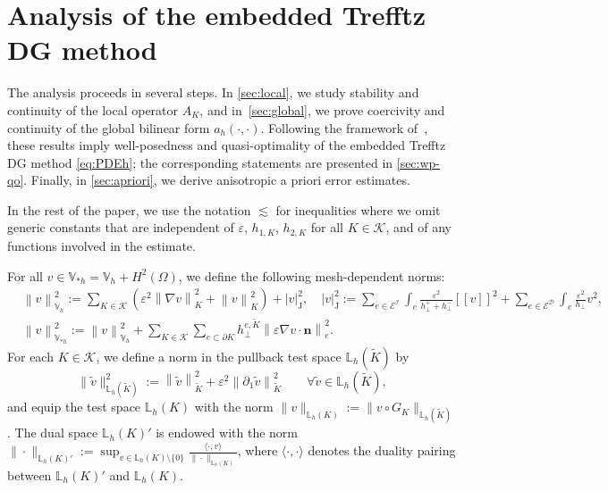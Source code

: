 \documentclass[a4paper,twoside,10pt]{article}
\newcommand{\Vsh}{V_{\!\star \hspace*{-0.2mm}h}}
\newcommand{\dgsnorm}[1]{\norm{#1}_{\Vsh}}
\newcommand*{\abs}[1]{\left|#1\right|}
\newcommand{\jmp}[1]{[\![ #1 ]\!]}
\newcommand{\LKh}{\mathbb{L}_h(K)}
\newcommand{\eps}{\varepsilon}
\newcommand*{\norm}[1]{\left\|#1\right\|}
\newcommand{\IL}{\mathbb{L}}
\newcommand{\calD}{\mathcal{D}}
\newcommand{\calE}{\mathcal{E}}
\newcommand{\calI}{\mathcal{I}}
\newcommand{\calK}{\mathcal{K}}
\newcommand{\bn}{\mathbf{n}}
\numberwithin{equation}{section}
\newcommand{\Vh}{\mathbb{V}_{\! h}}
\renewcommand{\Vsh}{\mathbb{V}_{*h}}
\newcommand{\hperp}{h_{\perp}}
\newcommand{\Kt}{\widetilde{K}}
\newcommand{\hKot}{h_{1,K}}
\newcommand{\hKtt}{h_{2,K}}
\begin{document}
	\section{Analysis of the embedded Trefftz DG method}\label{sec:stability}
	The analysis proceeds in several steps.
	In \cref{sec:local}, we study stability and continuity of the local operator $A_K$,  and  in~\cref{sec:global}, we 
	prove coercivity and continuity of the global bilinear form 
    $a_h(\cdot, \cdot)$.
	Following the framework of~\cite{LLSV_ARXIV_2024}, these results imply well-posedness and quasi-optimality of the embedded Trefftz DG method \eqref{eq:PDEh}; the corresponding statements are presented in \cref{sec:wp-qo}. 
	Finally, in \cref{sec:apriori}, we derive anisotropic a priori error estimates.
	
	In the rest of the paper, we use the notation $\lesssim$ for inequalities where we 
    omit
    generic constants that are
    independent of $\eps$, $\hKot$, $\hKtt$ for all $K\in\calK$, and of any functions involved in the estimate.
	
	For all $v\in \Vsh=\Vh+H^2(\Omega)$, we define the following  mesh-dependent norms:
	\begin{equation}\label{eq:Vhnorm}
		\begin{split}
	    &\norm{v}_{\Vh}^2:=\sum_{K\in\calK}\left(\varepsilon^2\norm{\nabla v}^2_{K}+\norm{v}^2_{K}\right)+\abs{v}_{\mathrm{J}}^2, \quad
		\abs{v}_{\mathrm{J}}^2:=\sum_{e\in\calE^{\calI}}\int_{e} \frac{\eps^2}{h^{+}_\perp+h^{-}_\perp} \jmp{v}^2
	    +\sum_{e\in\calE^{\calD}}\int_{e} \frac{\eps^2}{\hperp} v^2,\\
	    &\dgsnorm{v}^2:=
		\norm{v}_{\Vh}^2 + 
		\sum_{K\in\calK}\sum_{e\subset\partial  K} \hperp^{e, \Kt} \norm{\eps \nabla  v\cdot \bn}^2_{e}.
	\end{split}
	\end{equation}
For each $K\in\calK$, we define a norm 
in the pullback test space 
$\IL_h(\Kt)$ by
\begin{equation}\label{eq:norm_Lh}
	\|\tilde v\|^2_{\mathbb{L}_h(\Kt)}
	:= \norm{\tilde v}^2_{\Kt}
	+\eps^2\norm{\partial_1\tilde v}^2_{\Kt}
	\qquad \forall \tilde v\in \IL_h(\Kt),
\end{equation}
and equip the test space $\LKh$ with the norm
$\|v\|_{\LKh}:=\|v\circ G_K\|_{\mathbb{L}_h(\Kt)}$.
The dual space $\LKh'$ is endowed with the norm $\|\cdot\|_{\IL_h(K)'}:= \sup_{v\in \IL_h(K)\setminus \{0\}}\frac{\langle\cdot, v\rangle}{\|\cdot\|_{\IL_h(K)}}$, where $\langle \cdot, \cdot \rangle$ denotes the duality pairing between $\IL_h(K)'$ and $\IL_h(K)$.
\end{document}
